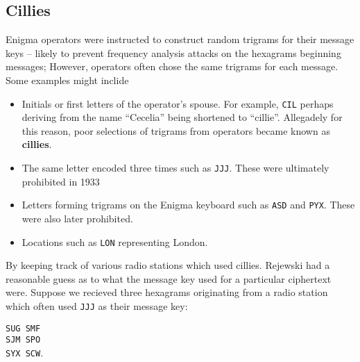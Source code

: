 \subsection{Cillies}\label{cillies}
Enigma operators were instructed to construct random trigrams for
their message keys -- likely to prevent frequency analysis attacks on
the hexagrams beginning messages; However, operators often chose the
same trigrams for each message. Some examples might inclide
\begin{itemize}
	\item Initials or first letters of the operator's spouse. For
	      example, \texttt{CIL} perhaps deriving from the name ``Cecelia''
	      being shortened to ``cillie''. Allegadely for this reason, poor
	      selections of trigrams from operators became known as {\bf{cillies}}.
	\item The same letter encoded three times such as \texttt{JJJ}. These were ultimately prohibited in 1933
	\item Letters forming trigrams on the Enigma keyboard such as \texttt{ASD} and \texttt{PYX}. These were also later prohibited.
	\item Locations such as \texttt{LON} representing London.

\end{itemize}
By keeping track of various radio stations which used cillies.
Rejewski had a reasonable guess as to what the message key used for a
particular ciphertext were. Suppose we recieved three hexagrams
originating from a radio station which often used \texttt{JJJ} as
their message key:
\begin{center}
	\texttt{SUG SMF}\\
	\texttt{SJM SPO}\\
	\texttt{SYX SCW}.
\end{center}

